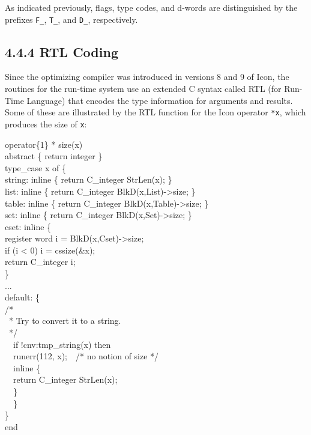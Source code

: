 As indicated previously, flags, type codes, and d-words are
distinguished by the prefixes \texttt{F\_}, \texttt{T\_}, and
\texttt{D\_}, respectively.

\subsection[4.4.4 RTL Coding]{4.4.4 RTL Coding}

Since the optimizing compiler was introduced in versions 8 and 9 of
Icon, the routines for the run-time system use an extended C syntax
called RTL (for Run-Time Language) that encodes the type information
for arguments and results. Some of these are illustrated by the RTL
function for the Icon operator \texttt{*x}, which produces the size of
\texttt{x}:

\begin{iconcode}
\>operator\{1\} * size(x)\\
\>abstract \{ return integer \}\\
\>type\_case x of \{\\
\>\>string: inline \{ return C\_integer StrLen(x); \}\\
\>\>list: inline \{ return C\_integer BlkD(x,List)->size; \}\\
\>\>table: inline \{ return C\_integer BlkD(x,Table)->size; \}\\
\>\>set: inline \{ return C\_integer BlkD(x,Set)->size; \}\\
\>\>cset: inline \{\\
\>\>\>register word i = BlkD(x,Cset)->size;\\
\>\>\>if (i < 0) i = cssize(\&x);\\
\>\>\>return C\_integer i;\\
\>\>\>\}\\
\>\>...\\
\>\>default: \{\\
\>\>\>\>/*\\
\>\>\>\>\ * Try to convert it to a string.\\
\>\>\>\>\ */\\
\>\>\>\ \ if !cnv:tmp\_string(x) then\\
\>\>\>\>\ \ runerr(112, x);\ \ /* no notion of size */\\
\>\>\>\ \ inline \{\\
\>\>\>\>\ \ return C\_integer StrLen(x);\\
\>\>\>\>\ \ \}\\
\>\>\>\ \ \}\\
\>\>\}\\
end
\end{iconcode}

